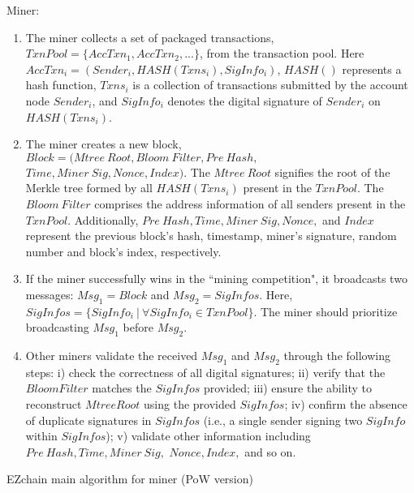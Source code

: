 \documentclass[conference]{IEEEtran}
\begin{document}
\begin{algorithm}[htp!]
  \SetAlgoLined
Miner:
\begin{enumerate}
    \item The miner collects a set of packaged transactions, $TxnPool = \{AccTxn_1, AccTxn_2, ... \}$, from the transaction pool. Here $AccTxn_i = (Sender_i, HASH(Txns_i), SigInfo_i)$, $HASH()$ represents a hash function, $Txns_i$ is a collection of transactions submitted by the account node $Sender_i$, and $SigInfo_i$ denotes the digital signature of $Sender_i$ on $HASH(Txns_i)$.
    \item The miner creates a new block, $Block = (Mtree~Root, Bloom~Filter, Pre~Hash,$ $Time, Miner~Sig, Nonce, Index)$. The $Mtree~Root$ signifies the root of the Merkle tree formed by all $HASH(Txns_i)$ present in the $TxnPool$. The $Bloom~Filter$ comprises the address information of all senders present in the $TxnPool$. Additionally, $Pre~Hash, Time, Miner~Sig, Nonce,$ and $Index$ represent the previous block's hash, timestamp, miner's signature, random number and block's index, respectively.
    \item If the miner successfully wins in the ``mining competition", it broadcasts two messages: $Msg_1 = Block$ and $Msg_2 = SigInfos$. Here, $SigInfos = \{SigInfo_i~|~\forall SigInfo_i \in TxnPool\}$. The miner should prioritize broadcasting $Msg_1$ before $Msg_2$.
    \item Other miners validate the received $Msg_1$ and $Msg_2$ through the following steps: i) check the correctness of all digital signatures; ii) verify that the $Bloom Filter$ matches the $SigInfos$ provided; iii) ensure the ability to reconstruct $Mtree Root$ using the provided $SigInfos$; iv) confirm the absence of duplicate signatures in $SigInfos$ (i.e., a single sender signing two $SigInfo$ within $SigInfos$); v) validate other information including $Pre~Hash, Time, Miner~Sig,$ $Nonce, Index,$ and so on.
\end{enumerate}
  \caption{EZchain main algorithm for miner (PoW version)}
  \label{alg: EZchain miner}
\end{algorithm}
\end{document}
